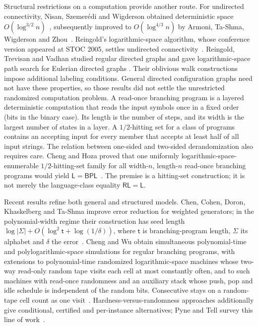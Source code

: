 \documentclass[11pt]{article}
\numberwithin{equation}{section}
\theoremstyle{definition}
\theoremstyle{remark}
\begin{document}
Structural restrictions on a computation provide another route.
For undirected connectivity, Nisan, Szemer\'edi and Wigderson obtained
deterministic space $O(\log^{3/2}n)$~\cite{NisanSzemerediWigderson1992},
subsequently improved to $O(\log^{4/3}n)$ by Armoni, Ta-Shma,
Wigderson and Zhou~\cite{ArmoniTaShmaWigdersonZhou2000}.
Reingold's logarithmic-space algorithm, whose conference version
appeared at STOC 2005, settles undirected connectivity~\cite{Reingold2005,Reingold2008}.
Reingold, Trevisan and Vadhan studied regular directed graphs and gave
logarithmic-space path search for Eulerian directed graphs
\cite{RTV2006}. Their oblivious walk constructions impose additional
labeling conditions. General directed configuration graphs need not
have these properties, so those results did not settle the unrestricted
randomized computation problem.
A read-once branching program is a layered deterministic computation
that reads the input symbols once in a fixed order (bits in the binary
case). Its length is the number of steps,
and its width is the largest number of states in a layer.
A $1/2$-hitting set for a class of programs contains an accepting input
for every member that accepts at least half of all input strings.
The relation between one-sided and two-sided derandomization also
requires care. Cheng and Hoza proved that one uniformly logarithmic-space-enumerable
$1/2$-hitting-set family for all width-$n$, length-$n$ read-once branching
programs would yield
$\mathsf L=\mathsf{BPL}$~\cite{ChengHoza2022}.
The premise is a hitting-set construction; it is not merely the
language-class equality $\mathsf{RL}=\mathsf L$.

Recent results refine both general and structured models.
Chen, Cohen, Doron, Khaskelberg and Ta-Shma improve error reduction for
weighted generators; in the polynomial-width regime their construction
has seed length $\log|\Sigma|+O(\log^2 {\mathsf{t}}+\log(1/\delta))$, where
${\mathsf{t}}$ is branching-program length, $\Sigma$ its alphabet and $\delta$
the error~\cite{ChenCohenDoronKhaskelbergTaShma2026}.
Cheng and Wu obtain simultaneous polynomial-time and polylogarithmic-space
simulations for regular branching programs, with extensions to polynomial-time
randomized logarithmic-space machines whose two-way read-only random tape
visits each cell at most constantly often, and to such machines with read-once randomness
and an auxiliary stack whose push, pop and idle schedule is independent
of the random bits. Consecutive stays on a random-tape cell count as one
visit~\cite[Theorems~5--6]{ChengWu2026SC}.
Hardness-versus-randomness approaches additionally give conditional,
certified and per-instance alternatives; Pyne and Tell survey this
line of work~\cite{PyneTell2026}.
\end{document}
